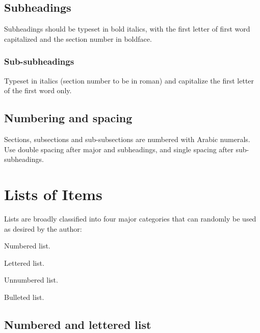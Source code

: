 \documentclass{ws-ijbc}
\begin{document}
\subsection{Subheadings}
Subheadings should be typeset in bold italics, with the first
letter of first word capitalized and the section number in
boldface.

\subsubsection{Sub-subheadings}
Typeset in italics (section number to be in roman) and capitalize
the first letter of the first word only.

\subsection{Numbering and spacing}
Sections, subsections and sub-subsections are numbered with Arabic
numerals. Use double spacing after major and subheadings, and
single spacing after sub-subheadings.

\section{Lists of Items}
Lists are broadly classified into four major categories that can
randomly be used as desired by the author:
\begin{alphlist}[(d)]
\item Numbered list.
\item Lettered list.
\item Unnumbered list.
\item Bulleted list.
\end{alphlist}

\subsection{Numbered and lettered list}
\end{document}
